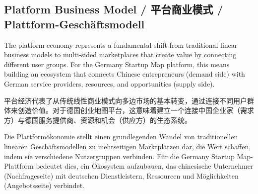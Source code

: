 \subsection{Platform Business Model / 平台商业模式 / Plattform-Geschäftsmodell}

The platform economy represents a fundamental shift from traditional linear business models to multi-sided marketplaces that create value by connecting different user groups. For the Germany Startup Map platform, this means building an ecosystem that connects Chinese entrepreneurs (demand side) with German service providers, resources, and opportunities (supply side).

平台经济代表了从传统线性商业模式向多边市场的基本转变，通过连接不同用户群体来创造价值。对于德国创业地图平台，这意味着建立一个连接中国企业家（需求方）与德国服务提供商、资源和机会（供应方）的生态系统。

Die Plattformökonomie stellt einen grundlegenden Wandel von traditionellen linearen Geschäftsmodellen zu mehrseitigen Marktplätzen dar, die Wert schaffen, indem sie verschiedene Nutzergruppen verbinden. Für die Germany Startup Map-Plattform bedeutet dies, ein Ökosystem aufzubauen, das chinesische Unternehmer (Nachfrageseite) mit deutschen Dienstleistern, Ressourcen und Möglichkeiten (Angebotsseite) verbindet.

